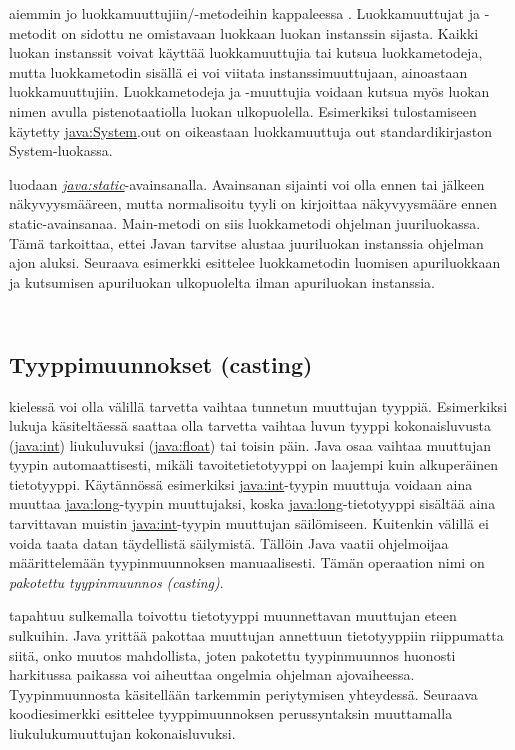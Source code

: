 \documentclass{tufte-book}
\newcommand{\eng}[1]{\textit{(#1)}}
\newcommand{\new}[1]{\textit{\gls{#1}}}
\newcommand{\neweng}[2]{\new{#1} \eng{#2}}
\newcommand{\java}[1]{\underline{\gls{java:#1}}}
\newcommand{\newjava}[1]{\textit{\java{#1}}}
\newcommand{\code}[3]{
\begin{listing}
    \inputminted{java}{OhjelmointiopasEsimerkit/src/#1/#2.java}
    \caption{#3}
    \label{Java-#1-#2}
\end{listing}
}
\begin{document}
 aiemmin jo luokkamuuttujiin/-metodeihin kappaleessa
. Luokkamuuttujat ja -metodit on sidottu ne omistavaan luokkaan luokan instanssin
sijasta. Kaikki luokan instanssit voivat käyttää luokkamuuttujia tai kutsua luokkametodeja, mutta
luokkametodin sisällä ei voi viitata instanssimuuttujaan, ainoastaan luokkamuuttujiin.
Luokkametodeja ja -muuttujia voidaan kutsua myös luokan nimen avulla pistenotaatiolla luokan
ulkopuolella. Esimerkiksi tulostamiseen käytetty \java{System}.out on oikeastaan luokkamuuttuja
out standardikirjaston System-luokassa.

 luodaan \newjava{static}-avainsanalla. Avainsanan
sijainti voi olla ennen tai jälkeen näkyvyysmääreen, mutta normalisoitu tyyli on kirjoittaa
näkyvyysmääre ennen static-avainsanaa. Main-metodi on siis luokkametodi ohjelman juuriluokassa.
Tämä tarkoittaa, ettei Javan tarvitse alustaa juuriluokan instanssia ohjelman ajon aluksi.
Seuraava esimerkki esittelee luokkametodin luomisen apuriluokkaan ja kutsumisen apuriluokan
ulkopuolelta ilman apuriluokan instanssia.

\code{week3/staticexample}{StaticPrinter}{Luokkametodin luominen \java{static}-avainsanalla}
\code{week3/staticexample}{Main}{Luokkametodin kutsuminen metodin määrittelevän luokan
ulkopuolella}

\subsection{Tyyppimuunnokset (casting)}
\label{casting}

 kielessä voi olla välillä tarvetta vaihtaa tunnetun
muuttujan tyyppiä. Esimerkiksi lukuja käsiteltäessä saattaa olla tarvetta vaihtaa luvun tyyppi
kokonaisluvusta (\java{int}) liukuluvuksi (\java{float}) tai toisin päin. Java osaa vaihtaa
muuttujan tyypin automaattisesti, mikäli tavoitetietotyyppi on laajempi kuin alkuperäinen
tietotyyppi. Käytännössä esimerkiksi \java{int}-tyypin muuttuja voidaan aina muuttaa
\java{long}-tyypin muuttujaksi, koska \java{long}-tietotyyppi sisältää aina tarvittavan muistin
\java{int}-tyypin muuttujan säilömiseen. Kuitenkin välillä ei voida taata datan täydellistä
säilymistä. Tällöin Java vaatii ohjelmoijaa määrittelemään tyypinmuunnoksen manuaalisesti.
Tämän operaation nimi on \neweng{pakotettu tyypinmuunnos}{casting}.

 tapahtuu sulkemalla toivottu tietotyyppi muunnettavan
muuttujan eteen sulkuihin. Java yrittää pakottaa muuttujan annettuun tietotyyppiin riippumatta
siitä, onko muutos mahdollista, joten pakotettu tyypinmuunnos huonosti harkitussa paikassa voi
aiheuttaa ongelmia ohjelman ajovaiheessa. Tyypinmuunnosta käsitellään tarkemmin periytymisen
yhteydessä. Seuraava koodiesimerkki esittelee tyyppimuunnoksen perussyntaksin muuttamalla
liukulukumuuttujan kokonaisluvuksi.
\end{document}
